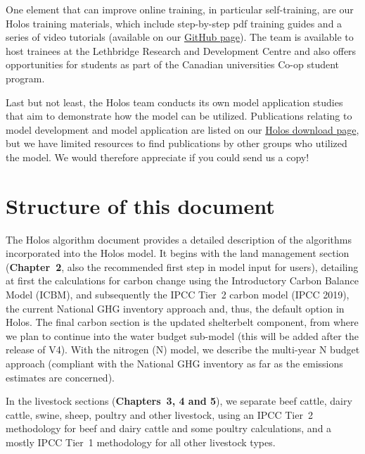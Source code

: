 One element that can improve online training, in particular self-training, are
our Holos training materials, which include step-by-step pdf training guides and
a series of video tutorials (available on our
\href{https://github.com/holos-aafc/Holos/tree/main}{GitHub page}). The team is
available to host trainees at the Lethbridge Research and Development Centre and
also offers opportunities for students as part of the Canadian universities
Co-op student program.

Last but not least, the Holos team conducts its own model application studies
that aim to demonstrate how the model can be utilized. Publications relating to
model development and model application are listed on our
\href{http://www.agr.gc.ca/eng/scientific-collaboration-and-research-in-agriculture/agricultural-research-results/holos-software-program/?id=1349181297838}{Holos download page},
but we have limited resources to find publications by other groups who utilized
the model. We would therefore appreciate if you could send us a copy!

\section{Structure of this document}
\label{sec:structure}

The Holos algorithm document provides a detailed description of the algorithms
incorporated into the Holos model. It begins with the land management section
(\textbf{Chapter~2}, also the recommended first step in model input for users),
detailing at first the calculations for carbon change using the Introductory
Carbon Balance Model (ICBM), and subsequently the IPCC Tier~2 carbon model
(IPCC 2019), the current National GHG inventory approach and, thus, the default
option in Holos. The final carbon section is the updated shelterbelt component,
from where we plan to continue into the water budget sub-model (this will be
added after the release of V4). With the nitrogen (N) model, we describe the
multi-year N budget approach (compliant with the National GHG inventory as far
as the emissions estimates are concerned).

In the livestock sections (\textbf{Chapters~3, 4 and 5}), we separate beef
cattle, dairy cattle, swine, sheep, poultry and other livestock, using an IPCC
Tier~2 methodology for beef and dairy cattle and some poultry calculations, and
a mostly IPCC Tier~1 methodology for all other livestock types.

